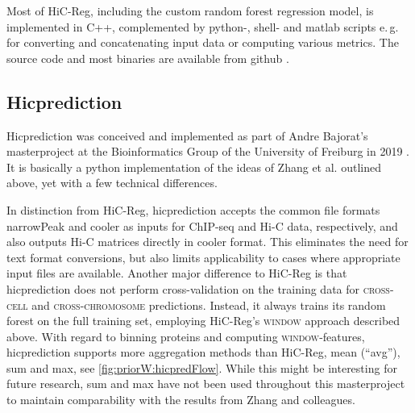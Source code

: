 Most of HiC-Reg, including the custom random forest regression model, is implemented in C++, 
complemented by python-, shell- and matlab scripts e.\,g. for converting and concatenating input data or 
computing various metrics. The source code and most binaries are available from github \cite{Roy2020}.

\subsection{Hicprediction}
Hicprediction was conceived and implemented as part of Andre Bajorat's masterproject at the Bioinformatics Group of the University of Freiburg
in 2019 \cite{Bajorat2019}. It is basically a python implementation of the ideas of Zhang et al. outlined above, 
yet with a few technical differences.

In distinction from HiC-Reg, hicprediction accepts the common file formats narrowPeak and cooler \cite{Abdennur2019}
as inputs for ChIP-seq and Hi-C data, respectively, and also outputs Hi-C matrices directly in cooler format.
This eliminates the need for text format conversions, 
but also limits applicability to cases where appropriate input files are available.
Another major difference to HiC-Reg is that hicprediction does not perform cross-validation on the training data
for \textsc{cross-cell} and \textsc{cross-chromosome} predictions.
Instead, it always trains its random forest on the full training set, 
employing HiC-Reg's \textsc{window} approach described above.
With regard to binning proteins and computing \textsc{window}-features, 
hicprediction supports more aggregation methods than HiC-Reg, mean (``avg''), sum and max, see \autoref{fig:priorW:hicpredFlow}.
While this might be interesting for future research, sum and max have not been used throughout this masterproject to
maintain comparability with the results from Zhang and colleagues.

